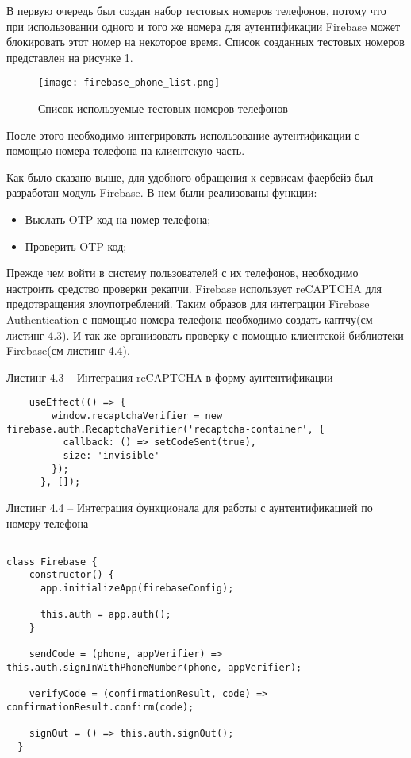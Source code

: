 В первую очередь был создан набор тестовых номеров телефонов, потому что при использовании одного и того же номера для аутентификации Firebase может блокировать этот номер на некоторое время.
Список созданных тестовых номеров представлен на рисунке \ref{fire:phones}.
\begin{figure}[ht]
    \centering
    \texttt{[image: firebase\_phone\_list.png]}
    \caption{ Список используемые тестовых номеров телефонов }
    \label{fire:phones}
\end{figure}

После этого необходимо интегрировать использование аутентификации с помощью номера телефона на клиентскую часть.

Как было сказано выше, для удобного обращения к сервисам фаербейз был разработан модуль Firebase.
В нем были реализованы функции:
\begin{itemize}
    \item Выслать OTP-код на номер телефона;
    \item Проверить OTP-код;
\end{itemize}

Прежде чем войти в систему пользователей с их телефонов, необходимо настроить средство проверки рекапчи.
Firebase использует reCAPTCHA для предотвращения злоупотреблений.
Таким образов для интеграции Firebase Authentication с помощью номера телефона необходимо создать каптчу(см листинг 4.3).
И так же организовать проверку с помощью клиентской библиотеки Firebase(см листинг 4.4).


Листинг 4.3 – Интеграция reCAPTCHA в форму аунтентификации
\begin{lstlisting}
    useEffect(() => {
        window.recaptchaVerifier = new firebase.auth.RecaptchaVerifier('recaptcha-container', {
          callback: () => setCodeSent(true),
          size: 'invisible'
        });
      }, []);
\end{lstlisting}

Листинг 4.4 – Интеграция функционала для работы с аунтентификацией по номеру телефона
\begin{lstlisting}

class Firebase {
    constructor() {
      app.initializeApp(firebaseConfig);

      this.auth = app.auth();
    }

    sendCode = (phone, appVerifier) => this.auth.signInWithPhoneNumber(phone, appVerifier);

    verifyCode = (confirmationResult, code) => confirmationResult.confirm(code);

    signOut = () => this.auth.signOut();
  }

\end{lstlisting}

